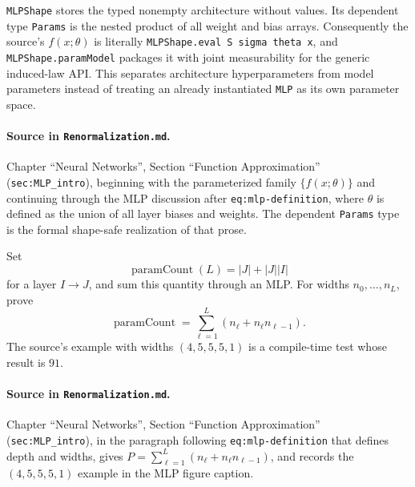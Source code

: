 \begin{definition}
\label{def:renorm:mlpShape}
\texttt{MLPShape} stores the typed nonempty architecture without values.  Its dependent type
\texttt{Params} is the nested product of all weight and bias arrays.  Consequently the source's
$f(x;\theta)$ is literally \texttt{MLPShape.eval S sigma theta x}, and
\texttt{MLPShape.paramModel} packages it with joint measurability for the generic induced-law API.
This separates architecture hyperparameters from model parameters instead of treating an already
instantiated \texttt{MLP} as its own parameter space.

\paragraph{Source in \texttt{Renormalization.md}.}
Chapter ``Neural Networks'', Section ``Function Approximation'' (\texttt{sec:MLP\_intro}), beginning
with the parameterized family $\{f(x;\theta)\}$ and continuing through the MLP discussion after
\texttt{eq:mlp-definition}, where $\theta$ is defined as the union of all layer biases and weights.
The dependent \texttt{Params} type is the formal shape-safe realization of that prose.
\end{definition}

\begin{definition}
\label{def:renorm:paramCount}
Set
\[
  \operatorname{paramCount}(L)=|J|+|J||I|
\]
for a layer $I\to J$, and sum this quantity through an MLP.  For widths
$n_0,\ldots,n_L$, prove
\[
  \operatorname{paramCount}=\sum_{\ell=1}^{L}(n_\ell+n_\ell n_{\ell-1}).
\]
The source's example with widths $(4,5,5,5,1)$ is a compile-time test whose result is $91$.

\paragraph{Source in \texttt{Renormalization.md}.}
Chapter ``Neural Networks'', Section ``Function Approximation'' (\texttt{sec:MLP\_intro}), in the
paragraph following \texttt{eq:mlp-definition} that defines depth and widths, gives
$P=\sum_{\ell=1}^{L}(n_\ell+n_\ell n_{\ell-1})$, and records the $(4,5,5,5,1)$ example in the MLP
figure caption.
\end{definition}

